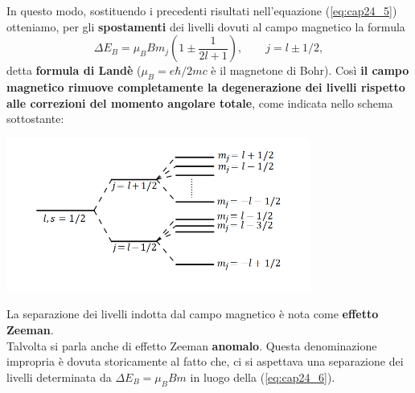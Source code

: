 \documentclass[a4paper,12pt,oneside]{book}
\begin{document}
In questo modo, sostituendo i precedenti risultati nell'equazione (\ref{eq:cap24_5}) otteniamo, per gli \textbf{spostamenti} dei livelli dovuti al campo magnetico la formula
\begin{equation} \label{eq:cap24_6}
\Delta E_B= \mu_B B m_j \left( 1\pm \frac{1}{2l+1}\right), \qquad j=l\pm 1/2 ,
\end{equation}
detta \textbf{formula di Landè} ($\mu_B=e\hbar /2mc$ è il magnetone di Bohr).
Così \textbf{il campo magnetico rimuove completamente la degenerazione dei livelli rispetto alle correzioni del momento angolare totale}, come indicata nello schema sottostante: 
\begin{center}
\includegraphics[width=10cm]{immagini/cap_24/fig24_1.png}
\end{center}

La separazione dei livelli indotta dal campo magnetico è nota come \textbf{effetto Zeeman}. \\
Talvolta si parla anche di effetto Zeeman \textbf{anomalo}. Questa denominazione impropria è dovuta storicamente al fatto che, ci si aspettava una separazione dei livelli determinata da $\Delta E_B=\mu_BBm$ in luogo della (\ref{eq:cap24_6}).
\end{document}
